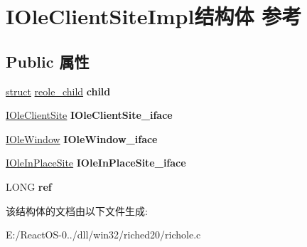 \hypertarget{struct_i_ole_client_site_impl}{}\section{I\+Ole\+Client\+Site\+Impl结构体 参考}
\label{struct_i_ole_client_site_impl}
\subsection*{Public 属性}
\begin{DoxyCompactItemize}
\item 
\mbox{\label{struct_i_ole_client_site_impl_a3f5f7860f3e68dd7892bb1758509431f}} 
\hyperlink{interfacestruct}{struct} \hyperlink{structreole__child}{reole\+\_\+child} {\bfseries child}
\item 
\mbox{\label{struct_i_ole_client_site_impl_a4d314f2076bff69ab6a9389e022399af}} 
\hyperlink{interface_i_ole_client_site}{I\+Ole\+Client\+Site} {\bfseries I\+Ole\+Client\+Site\+\_\+iface}
\item 
\mbox{\label{struct_i_ole_client_site_impl_a23f64af92c85a67327ff514e3886913f}} 
\hyperlink{interface_i_ole_window}{I\+Ole\+Window} {\bfseries I\+Ole\+Window\+\_\+iface}
\item 
\mbox{\label{struct_i_ole_client_site_impl_ae768ce5dbc30ad5fde42a31453001be1}} 
\hyperlink{interface_i_ole_in_place_site}{I\+Ole\+In\+Place\+Site} {\bfseries I\+Ole\+In\+Place\+Site\+\_\+iface}
\item 
\mbox{\label{struct_i_ole_client_site_impl_a3c9600359f1e788e756d379fe55c5e33}} 
L\+O\+NG {\bfseries ref}
\end{DoxyCompactItemize}


该结构体的文档由以下文件生成\+:\begin{DoxyCompactItemize}
\item 
E\+:/\+React\+O\+S-\/0../dll/win32/riched20/richole.\+c\end{DoxyCompactItemize}

